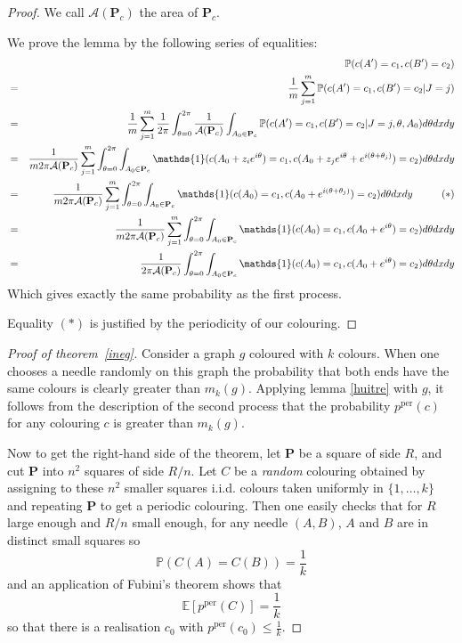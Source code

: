 \documentclass[a4paper,11pt]{article}
\theoremstyle{definition}
\theoremstyle{remark}
\renewcommand{\Pr}{\mathbb{P}}
\newcommand{\Esp}{\mathbb{E}}
\renewcommand{\P}{\mathbf{P}}
\newcommand{\pper}{p^{\mathrm{per}}}
\begin{document}
\begin{proof}
We call $\mathcal{A}(\P_c)$ the area of $\P_c$.

We prove the lemma by the following series of equalities:
\begin{eqnarray*}
& & \mathbb{P}(c(A') = c_1, c(B') = c_2) \\
  &=& \frac{1}{m}\sum_{j=1}^{m} \mathbb{P}(c(A') = c_1, c(B') = c_2 | J=j)  \\
  &=& \frac{1}{m}\sum_{j=1}^{m}  \frac{1}{2\pi}\int_{\theta =0} ^{2\pi} \frac{1}{\mathcal{A}(\P_c)}\int_{A_0 \in \P_c} \mathbb{P}(c(A') = c_1, c(B') = c_2 | J=j, \theta, A_0) d\theta dx dy \\  
  &=& \frac{1}{m 2\pi \mathcal{A}(\P_c)}\sum_{j=1}^{m}\int_{\theta =0} ^{2\pi} \int_{A_0 \in \P_c} \mathds{1}(c(A_0 + z_i e^{i\theta}) = c_1, c(A_0 +z_j e^{i\theta} + e^{i (\theta + \theta_j)}) = c_2) d\theta dx dy \\  
    &=& \frac{1}{m 2\pi \mathcal{A}(\P_c)}\sum_{j=1}^{m} \int_{\theta =0} ^{2\pi} \int_{A_0 \in \P_c} \mathds{1}(c(A_0) = c_1, c(A_0 + e^{i (\theta + \theta_j)}) = c_2 ) d\theta dx dy \hspace{1 cm} (*)\\ 
    &=& \frac{1}{m 2\pi \mathcal{A}(\P_c)}\sum_{j=1}^{m} \int_{\theta =0} ^{2\pi} \int_{A_0 \in \P_c} \mathds{1}(c(A_0) = c_1, c(A_0 + e^{i \theta}) = c_2 ) d\theta dx dy \\ 
    &=& \frac{1}{2\pi \mathcal{A}(\P_c)}\int_{\theta =0} ^{2\pi} \int_{A_0 \in \P_c} \mathds{1}(c(A_0) = c_1, c(A_0 + e^{i \theta}) = c_2 ) d\theta dx dy \\ 
\end{eqnarray*}
Which gives exactly the same probability as the first process.

Equality $(*)$ is justified by the periodicity of our colouring.
\end{proof}

\begin{proof}[Proof of theorem~\ref{ineg}]
Consider a graph $g$ coloured with $k$ colours. When one chooses a needle
randomly on this graph the probability that both ends have the same
colours is clearly greater than $m_k(g)$. Applying lemma \ref{huitre} with $g$, 
it follows from the description of the second process that the probability 
$\pper(c)$ for any colouring $c$ is greater than $m_k(g)$.

Now to get the right-hand side of the theorem, let $\P$ be a square of side $R$,
and cut $\P$ into $n^2$ squares of side $R/n$. Let $C$ be a \textit{random} 
colouring obtained by assigning to these $n^2$ smaller squares i.i.d. colours
taken uniformly in $\{1,\dots,k\}$ and repeating $\P$ to get a periodic 
colouring. Then one easily checks that for $R$ large enough and $R/n$ small
enough, for any needle $(A,B)$, $A$ and $B$ are in distinct small squares so
$$\Pr(C(A)=C(B)) = \frac1k$$
and an application of Fubini's theorem shows that
$$\Esp[\pper(C)] = \frac1k$$
so that there is a realisation $c_0$ with $\pper(c_0) \leq \frac1k$.
\end{proof}
\end{document}
